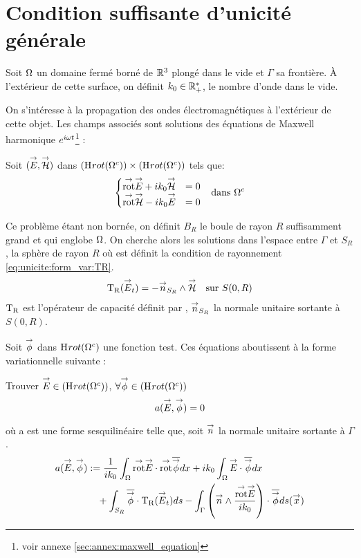 \section{Condition suffisante d'unicité générale}

  Soit \(\Omega\) un domaine fermé borné de \(\mathbb R^3\) plongé dans le vide et \(\Gamma\) sa frontière.
  À l'extérieur de cette surface, on définit \(k_0 \in \mathbb R_+^*\), le nombre d'onde dans le vide.

  On s’intéresse à la propagation des ondes électromagnétiques à l'extérieur de cette objet. Les champs associés sont solutions des équations de Maxwell harmonique \(e^{i\omega t}\)\footnote{voir annexe \ref{sec:annex:maxwell_equation}} :

  Soit \(({\overset{\rightarrow}{E}},{\overset{\rightarrow}{\mathcal{H}}})\) dans \((\mathrm{H}_\mathrm{{}}{rot}(\Omega^c)) \times (\mathrm{H}_\mathrm{{}}{rot}(\Omega^c))\) tels que:
  \begin{align}
  \left\lbrace
    \begin{matrix}
      {{\overset{\rightarrow}{\operatorname{rot}}}} {\overset{\rightarrow}{E}} + i k_0 {\overset{\rightarrow}{\mathcal{H}}} &= 0
      \\
      {{\overset{\rightarrow}{\operatorname{rot}}}} {\overset{\rightarrow}{\mathcal{H}}} - i k_0 {\overset{\rightarrow}{E}} &= 0
    \end{matrix}
    \right. && \text{dans \(\Omega^c\)}
  \end{align}

  Ce problème étant non bornée, on définit \(B_R\) le boule de rayon \(R\) suffisamment grand et qui englobe \(\Omega\). On cherche alors les solutions dans l'espace entre \(\Gamma\) et \(S_R\), la sphère de rayon \(R\) où est définit la condition de rayonnement \eqref{eq:unicite:form_var:TR}.
  \begin{equation}
    \label{eq:unicite:form_var:TR}
    \begin{aligned}
    \operatorname{T_R}({\overset{\rightarrow}{E}}_t) = - {\overset{\rightarrow}{n}}_{S_R} \wedge {\overset{\rightarrow}{\mathcal{H}}} && \text{sur \(S(0,R)\)}
    \end{aligned}
  \end{equation}
  \(\operatorname{T_R}\) est l'opérateur de capacité définit par \cite[p.~200]{nedelec_acoustic_2001}, \({\overset{\rightarrow}{n}}_{S_R}\) la normale unitaire sortante à \(S(0,R)\).

  Soit \({\overset{\rightarrow}{\phi}}\) dans \(\mathrm{H}_\mathrm{{}}{rot}(\Omega^c)\) une fonction test. Ces équations aboutissent à la forme variationnelle suivante :
  \begin{prop}
    Trouver \({\overset{\rightarrow}{E}} \in \left(\mathrm{H}_\mathrm{{}}{rot}(\Omega^c)\right)\), \(\forall {\overset{\rightarrow}{\phi}} \in \left(\mathrm{H}_\mathrm{{}}{rot}(\Omega^c)\right)\)
    \[
      a({\overset{\rightarrow}{E}},{\overset{\rightarrow}{\phi}}) = 0
    \]
  \end{prop}

  où a est une forme sesquilinéaire telle que, soit \({\overset{\rightarrow}{n}}\) la normale unitaire sortante à \(\Gamma\).
  \begin{equation*}
    \begin{aligned}
    a({\overset{\rightarrow}{E}},{\overset{\rightarrow}{\phi}}) &:=  \dfrac{1}{ik_0} \int_\Omega {{\overset{\rightarrow}{\operatorname{rot}}}} {\overset{\rightarrow}{E}} \cdot {{\overset{\rightarrow}{\operatorname{rot}}}} {\overline{{\overset{\rightarrow}{\phi}}}} dx + ik_0\int_\Omega{\overset{\rightarrow}{E}}\cdot{\overline{{\overset{\rightarrow}{\phi}}}} dx
      \\ 
      & \quad + \int_{S_R} {\overline{ {\overset{\rightarrow}{\phi}} }} \cdot \operatorname{T_R}({\overset{\rightarrow}{E}}_t)ds - \int_\Gamma \left({\overset{\rightarrow}{n}} \wedge \dfrac{{{\overset{\rightarrow}{\operatorname{rot}}}} {\overset{\rightarrow}{E}}}{ik_0}\right) \cdot {\overline{{\overset{\rightarrow}{\phi}}}} ds({\overset{\rightarrow}{x}})
    \end{aligned}
   \end{equation*}


